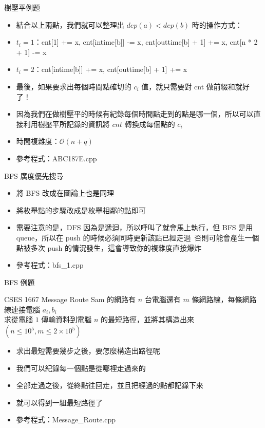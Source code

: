 \documentclass[aspectratio=169]{beamer}
\begin{document}
    \begin{frame}{樹壓平例題}
        \begin{itemize}
            \item<1-> 結合以上兩點，我們就可以整理出 $dep(a) < dep(b)$ 時的操作方式：
            \item<2-> $t_i = 1$：cnt[1] += x, cnt[intime[b]] -= x, cnt[outtime[b] + 1] += x, cnt[n * 2 + 1] -= x
            \item<2-> $t_i = 2$：cnt[intime[b]] += x, cnt[outtime[b] + 1] += x
            \item<3-> 最後，如果要求出每個時間點確切的 $c_i$ 值，就只需要對 cnt 做前綴和就好了！
            \item<4-> 因為我們在做樹壓平的時候有紀錄每個時間點走到的點是哪一個，所以可以直接利用樹壓平所記錄的資訊將 $cnt$ 轉換成每個點的 $c_i$
            \item<4-> 時間複雜度：$\mathcal{O}(n + q)$
            \item<4-> 參考程式：ABC187E.cpp
        \end{itemize}
    \end{frame}



    \begin{frame}{BFS 廣度優先搜尋}
        \begin{itemize}
            \item 將 BFS 改成在圖論上也是同理
            \item 將枚舉點的步驟改成是枚舉相鄰的點即可
            \item 需要注意的是，DFS 因為是遞迴，所以呼叫了就會馬上執行，但 BFS 是用 queue，所以在 push 的時候必須同時更新該點已經走過\
            否則可能會產生一個點被多次 push 的情況發生，這會導致你的複雜度直接爆炸
            \item 參考程式：bfs\_1.cpp
        \end{itemize}
    \end{frame}

    \begin{frame}{BFS 例題}
        \begin{block}{CSES 1667 Message Route}
            Sam 的網路有 $n$ 台電腦還有 $m$ 條網路線，每條網路線連接電腦 $a_i, b_i$\\
            求從電腦 $1$ 傳輸資料到電腦 $n$ 的最短路徑，並將其構造出來 $(n \le 10^5, m \le 2 \times 10^5)$
        \end{block}

        \begin{itemize}
            \item<1-> 求出最短需要幾步之後，要怎麼構造出路徑呢
            \item<2-> 我們可以紀錄每一個點是從哪裡走過來的
            \item<3-> 全部走過之後，從終點往回走，並且把經過的點都記錄下來
            \item<3-> 就可以得到一組最短路徑了
            \item<3-> 參考程式：Message\_Route.cpp
        \end{itemize}
    \end{frame}
\end{document}
